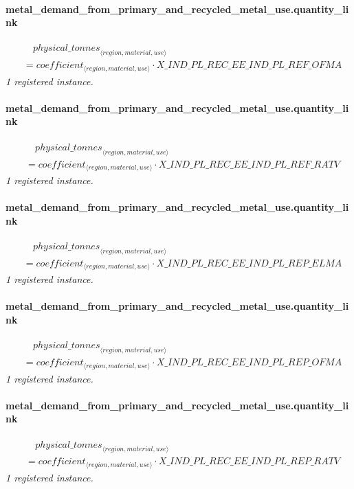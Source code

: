\documentclass[11pt]{article}
\begin{document}
\paragraph{metal\_demand\_from\_primary\_and\_recycled\_metal\_use.quantity\_link}
\begin{align*}
&\quad {physical\_tonnes}_{\langle region, material, use\rangle}\\
&= coefficient_{\langle region, material, use\rangle} \cdot X\_IND\_PL\_REC\_EE\_IND\_PL\_REF\_OFMA
\end{align*}
\noindent\emph{1 registered instance.}\par
\paragraph{metal\_demand\_from\_primary\_and\_recycled\_metal\_use.quantity\_link}
\begin{align*}
&\quad {physical\_tonnes}_{\langle region, material, use\rangle}\\
&= coefficient_{\langle region, material, use\rangle} \cdot X\_IND\_PL\_REC\_EE\_IND\_PL\_REF\_RATV
\end{align*}
\noindent\emph{1 registered instance.}\par
\paragraph{metal\_demand\_from\_primary\_and\_recycled\_metal\_use.quantity\_link}
\begin{align*}
&\quad {physical\_tonnes}_{\langle region, material, use\rangle}\\
&= coefficient_{\langle region, material, use\rangle} \cdot X\_IND\_PL\_REC\_EE\_IND\_PL\_REP\_ELMA
\end{align*}
\noindent\emph{1 registered instance.}\par
\paragraph{metal\_demand\_from\_primary\_and\_recycled\_metal\_use.quantity\_link}
\begin{align*}
&\quad {physical\_tonnes}_{\langle region, material, use\rangle}\\
&= coefficient_{\langle region, material, use\rangle} \cdot X\_IND\_PL\_REC\_EE\_IND\_PL\_REP\_OFMA
\end{align*}
\noindent\emph{1 registered instance.}\par
\paragraph{metal\_demand\_from\_primary\_and\_recycled\_metal\_use.quantity\_link}
\begin{align*}
&\quad {physical\_tonnes}_{\langle region, material, use\rangle}\\
&= coefficient_{\langle region, material, use\rangle} \cdot X\_IND\_PL\_REC\_EE\_IND\_PL\_REP\_RATV
\end{align*}
\noindent\emph{1 registered instance.}\par
\end{document}
